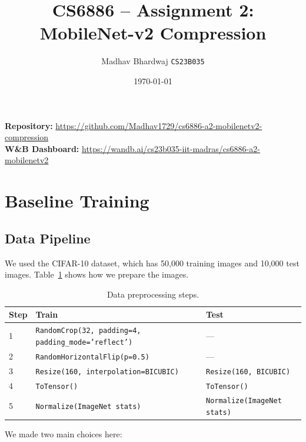 \documentclass[11pt,a4paper]{article}
\title{\textbf{CS6886 -- Assignment 2: MobileNet-v2 Compression}\\[2mm]}
\author{Madhav Bhardwaj \quad \texttt{CS23B035}}
\date{\today}
\begin{document}
\maketitle

\noindent
\textbf{Repository:}
\url{https://github.com/Madhav1729/cs6886-a2-mobilenetv2-compression} \\

\textbf{W\&B Dashboard:}
\url{https://wandb.ai/cs23b035-iit-madras/cs6886-a2-mobilenetv2}

\vspace{4mm}


\section{Baseline Training}


\subsection{Data Pipeline}

We used the CIFAR-10 dataset, which has 50,000 training images and 10,000 test images. Table~\ref{tab:transforms} shows how we prepare the images.

\begin{table}[ht]
\centering
\begin{tabular}{@{}lll@{}}
\toprule
\textbf{Step} & \textbf{Train} & \textbf{Test} \\
\midrule
1 & \texttt{RandomCrop(32, padding=4, padding\_mode='reflect')} & --- \\
2 & \texttt{RandomHorizontalFlip(p=0.5)} & --- \\
3 & \texttt{Resize(160, interpolation=BICUBIC)} & \texttt{Resize(160, BICUBIC)} \\
4 & \texttt{ToTensor()} & \texttt{ToTensor()} \\
5 & \texttt{Normalize(ImageNet stats)} & \texttt{Normalize(ImageNet stats)} \\
\bottomrule
\end{tabular}
\caption{Data preprocessing steps.}
\label{tab:transforms}
\end{table}

We made two main choices here:
\end{document}
